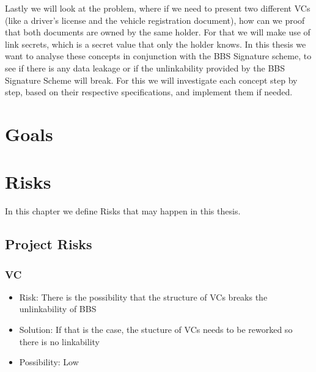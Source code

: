 \documentclass[
	a4paper               %
	,bibliography=totoc   %
	,listof=totoc         %
	,monolingual
	twoside=false,
]{bfhthesis}              %
\begin{document}
Lastly we will look at the problem, where if we need to present two different VCs (like a driver's license and the vehicle registration document), how can we proof that both documents are owned by the same holder.
For that we will make use of link secrets\cite{linksecrets}, which is a secret value that only the holder knows.
In this thesis we want to analyse these concepts in conjunction with the BBS Signature scheme, to see if there is any data leakage or if the unlinkability provided by the BBS Signature Scheme will break.
For this we will investigate each concept step by step, based on their respective specifications, and implement them if needed.

\chapter{Goals}

\chapter{Risks}
In this chapter we define Risks that may happen in this thesis.

\section{Project Risks}

\subsection{VC}
\begin{itemize}
	\item Risk: There is the possibility that the structure of VCs breaks the unlinkability of BBS
	\item Solution: If that is the case, the stucture of VCs needs to be reworked so there is no linkability
	\item Possibility: Low
\end{itemize}
\end{document}
